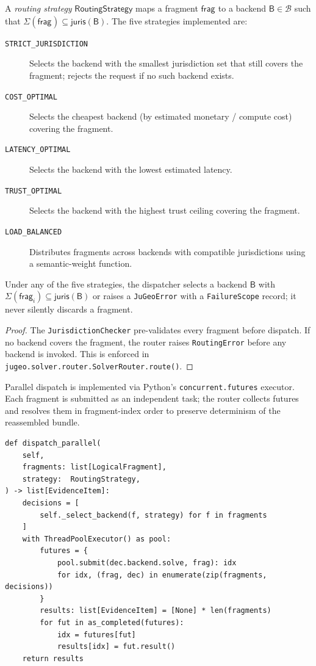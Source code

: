 \documentclass[11pt]{article}
\newcommand{\RouteStrat}{\mathsf{RoutingStrategy}}
\newcommand{\Frag}[1]{\mathsf{frag}_{#1}} %
\newcommand{\Backend}{\mathsf{B}}         %
\newcommand{\BJuris}{\mathsf{juris}}      %
\begin{document}
\begin{definition}\label{def:routing-strategy}
A \emph{routing strategy} $\RouteStrat$ maps a fragment $\Frag{}$
to a backend $\Backend \in \mathcal{B}$ such that
$\Sigma(\Frag{}) \subseteq \BJuris(\Backend)$.  The five strategies
implemented are:
\begin{description}
  \item[\texttt{STRICT\_JURISDICTION}] Selects the backend with the
    smallest jurisdiction set that still covers the fragment; rejects
    the request if no such backend exists.
  \item[\texttt{COST\_OPTIMAL}] Selects the cheapest backend (by
    estimated monetary / compute cost) covering the fragment.
  \item[\texttt{LATENCY\_OPTIMAL}] Selects the backend with the lowest
    estimated latency.
  \item[\texttt{TRUST\_OPTIMAL}] Selects the backend with the highest
    trust ceiling covering the fragment.
  \item[\texttt{LOAD\_BALANCED}] Distributes fragments across backends
    with compatible jurisdictions using a semantic-weight function.
\end{description}
\end{definition}

\begin{proposition}\label{prop:dispatch-coverage}
Under any of the five strategies, the dispatcher selects a backend
$\Backend$ with $\Sigma(\Frag{i}) \subseteq \BJuris(\Backend)$ or
raises a \texttt{JuGeoError} with a \texttt{FailureScope} record; it
never silently discards a fragment.
\end{proposition}

\begin{proof}
The \texttt{JurisdictionChecker} pre-validates every fragment before
dispatch.  If no backend covers the fragment, the router raises
\texttt{RoutingError} before any backend is invoked.  This is enforced
in \texttt{jugeo.solver.router.SolverRouter.route()}.
\end{proof}

Parallel dispatch is implemented via Python's \texttt{concurrent.futures}
executor.  Each fragment is submitted as an independent task; the router
collects futures and resolves them in fragment-index order to preserve
determinism of the reassembled bundle.

\begin{lstlisting}[style=jugeo-python,
  caption={Sketch of the parallel dispatch step in EvidenceRouter.},
  label={lst:dispatch}]
def dispatch_parallel(
    self,
    fragments: list[LogicalFragment],
    strategy:  RoutingStrategy,
) -> list[EvidenceItem]:
    decisions = [
        self._select_backend(f, strategy) for f in fragments
    ]
    with ThreadPoolExecutor() as pool:
        futures = {
            pool.submit(dec.backend.solve, frag): idx
            for idx, (frag, dec) in enumerate(zip(fragments, decisions))
        }
        results: list[EvidenceItem] = [None] * len(fragments)
        for fut in as_completed(futures):
            idx = futures[fut]
            results[idx] = fut.result()
    return results
\end{lstlisting}
\end{document}

